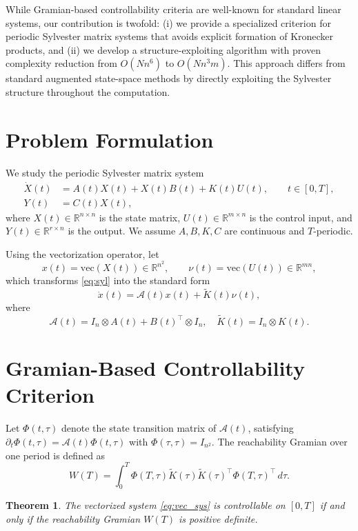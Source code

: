 \documentclass[5p,times]{elsarticle} %
\newtheorem{theorem}{Theorem}
\newcommand{\vect}{\mathrm{vec}}
\newcommand{\Ktil}{\widetilde{K}}
\newcommand{\Acal}{\mathcal{A}}
\begin{document}
While Gramian-based controllability criteria are well-known for standard linear systems, our contribution is twofold: (i) we provide a specialized criterion for periodic Sylvester matrix systems that avoids explicit formation of Kronecker products, and (ii) we develop a structure-exploiting algorithm with proven complexity reduction from $O(Nn^6)$ to $O(Nn^3m)$. This approach differs from standard augmented state-space methods by directly exploiting the Sylvester structure throughout the computation.

\section{Problem Formulation}
We study the periodic Sylvester matrix system
\begin{align}
\dot X(t) &= A(t)X(t) + X(t)B(t) + K(t)U(t),\qquad t\in[0,T],\label{eq:syl}\\
Y(t) &= C(t)X(t),
\end{align}
where \(X(t)\in\mathbb{R}^{n\times n}\) is the state matrix, \(U(t)\in\mathbb{R}^{m\times n}\) is the control input, and \(Y(t)\in\mathbb{R}^{r\times n}\) is the output. We assume \(A,B,K,C\) are continuous and \(T\)-periodic.

Using the vectorization operator, let
\[
x(t)=\vect(X(t))\in\mathbb{R}^{n^2},\qquad \nu(t)=\vect(U(t))\in\mathbb{R}^{mn},
\]
which transforms \eqref{eq:syl} into the standard form
\begin{equation}\label{eq:vec_sys}
\dot x(t)=\Acal(t)x(t)+\Ktil(t)\nu(t),
\end{equation}
where
\[
\Acal(t)=I_n\otimes A(t)+B(t)^\top\otimes I_n,\quad
\Ktil(t)=I_n\otimes K(t).
\]

\section{Gramian-Based Controllability Criterion}
Let $\Phi(t,\tau)$ denote the state transition matrix of $\Acal(t)$, satisfying
$\partial_t\Phi(t,\tau)=\Acal(t)\Phi(t,\tau)$ with $\Phi(\tau,\tau)=I_{n^2}$.
The reachability Gramian over one period is defined as
\begin{equation}\label{eq:W}
W(T)=\int_0^T \Phi(T,\tau)\Ktil(\tau)\Ktil(\tau)^\top\Phi(T,\tau)^\top\,d\tau.
\end{equation}

\begin{theorem}\label{thm:main}
The vectorized system \eqref{eq:vec_sys} is controllable on \([0,T]\) if and only if the reachability Gramian \(W(T)\) is positive definite.
\end{theorem}
\end{document}
